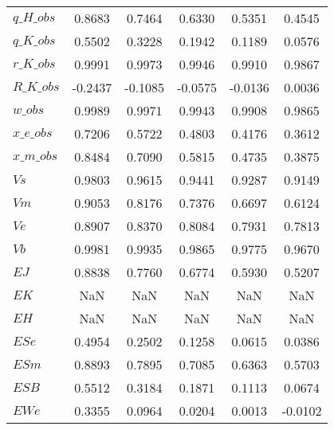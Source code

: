 \begin{center}
\begin{longtable}{lccccc}
$q\_H\_obs                  $	 & 	    0.8683	 & 	    0.7464	 & 	    0.6330	 & 	    0.5351	 & 	    0.4545 \\ 
$q\_K\_obs                  $	 & 	    0.5502	 & 	    0.3228	 & 	    0.1942	 & 	    0.1189	 & 	    0.0576 \\ 
$r\_K\_obs                  $	 & 	    0.9991	 & 	    0.9973	 & 	    0.9946	 & 	    0.9910	 & 	    0.9867 \\ 
$R\_K\_obs                  $	 & 	   -0.2437	 & 	   -0.1085	 & 	   -0.0575	 & 	   -0.0136	 & 	    0.0036 \\ 
$w\_obs                     $	 & 	    0.9989	 & 	    0.9971	 & 	    0.9943	 & 	    0.9908	 & 	    0.9865 \\ 
$x\_e\_obs                  $	 & 	    0.7206	 & 	    0.5722	 & 	    0.4803	 & 	    0.4176	 & 	    0.3612 \\ 
$x\_m\_obs                  $	 & 	    0.8484	 & 	    0.7090	 & 	    0.5815	 & 	    0.4735	 & 	    0.3875 \\ 
$Vs                         $	 & 	    0.9803	 & 	    0.9615	 & 	    0.9441	 & 	    0.9287	 & 	    0.9149 \\ 
$Vm                         $	 & 	    0.9053	 & 	    0.8176	 & 	    0.7376	 & 	    0.6697	 & 	    0.6124 \\ 
$Ve                         $	 & 	    0.8907	 & 	    0.8370	 & 	    0.8084	 & 	    0.7931	 & 	    0.7813 \\ 
$Vb                         $	 & 	    0.9981	 & 	    0.9935	 & 	    0.9865	 & 	    0.9775	 & 	    0.9670 \\ 
$EJ                         $	 & 	    0.8838	 & 	    0.7760	 & 	    0.6774	 & 	    0.5930	 & 	    0.5207 \\ 
$EK                         $	 & 	       NaN	 & 	       NaN	 & 	       NaN	 & 	       NaN	 & 	       NaN \\ 
$EH                         $	 & 	       NaN	 & 	       NaN	 & 	       NaN	 & 	       NaN	 & 	       NaN \\ 
$ESe                        $	 & 	    0.4954	 & 	    0.2502	 & 	    0.1258	 & 	    0.0615	 & 	    0.0386 \\ 
$ESm                        $	 & 	    0.8893	 & 	    0.7895	 & 	    0.7085	 & 	    0.6363	 & 	    0.5703 \\ 
$ESB                        $	 & 	    0.5512	 & 	    0.3184	 & 	    0.1871	 & 	    0.1113	 & 	    0.0674 \\ 
$EWe                        $	 & 	    0.3355	 & 	    0.0964	 & 	    0.0204	 & 	    0.0013	 & 	   -0.0102 \\ 

\end{longtable}
\end{center}
